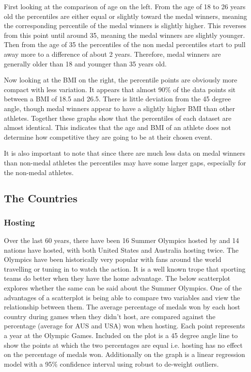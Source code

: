 \documentclass[a4 paper, 12pt]{article}
\begin{document}
        First looking at the comparison of age on the left. From the age of 18 to 26 years old the percentiles are either equal or slightly toward the medal winners, meaning the corresponding percentile of the medal winners is slightly higher. This reverses from this point until around 35, meaning the medal winners are slightly younger. Then from the age of 35 the percentiles of the non medal percentiles start to pull away more to a difference of about 2 years. Therefore, medal winners are generally older than 18 and younger than 35 years old. 

        Now looking at the BMI on the right, the percentile points are obviously more compact with less variation. It appears that almost 90\% of the data points sit between a BMI of 18.5 and 26.5. There is little deviation from the 45 degree angle, though medal winners appear to have a slightly higher BMI than other athletes. Together these graphs show that the percentiles of each dataset are almost identical. This indicates that the age and BMI of an athlete does not determine how competitive they are going to be at their chosen event.

        It is also important to note that since there are much less data on medal winners than non-medal athletes the percentiles may have some larger gaps, especially for the non-medal athletes.
    
    \subsection{The Countries}

        \subsubsection{Hosting}
        Over the last 60 years, there have been 16 Summer Olympics hosted by and 14 nations have hosted, with both United States and Australia hosting twice. The Olympics have been historically very popular with fans around the world travelling or tuning in to watch the action. It is a well known trope that sporting teams do better when they have the home advantage. The below scatterplot explores whether the same can be said about the Summer Olympics. One of the advantages of a scatterplot is being able to compare two variables and view the relationship between them. The average percentage of medals won by each host country during games when they didn't host, are compared against the percentage (average for AUS and USA) won when hosting. Each point represents a year at the Olympic Games. Included on the plot is a 45 degree angle line to show the points at which the two percentages are equal i.e. hosting has no effect on the percentage of medals won. Additionally on the graph is a linear regression model with a 95\% confidence interval using robust to de-weight outliers. 
\end{document}
